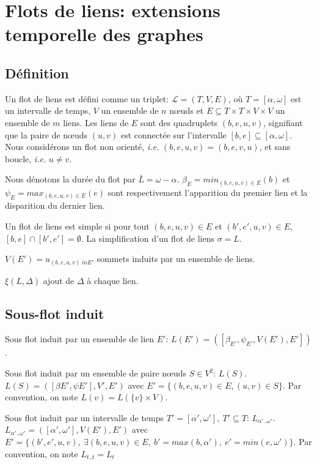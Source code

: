 \chapter{Flots de liens: extensions temporelle des graphes}
\minitoc
\label{chap:def_flot}

\section{Définition}
\label{sec:definition}
Un flot de liens est défini comme un triplet: $\mathcal{L}=(T,V,E)$, où $T=[\alpha, \omega]$ est un intervalle de temps, $V$ un ensemble de $n$ n\oe uds et $E\subseteq T\times T \times V \times V$ un ensemble de $m$ liens.
Les liens de $E$ sont des quadruplets $(b,e,u,v)$, signifiant que la paire de n\oe uds $(u, v)$ est connectée sur l'intervalle $[b,e] \subseteq [\alpha,\omega]$.
Nous considérons un flot non orienté, \emph{i.e.} $(b,e,u,v)=(b,e,v,u)$, et sans boucle, \emph{i.e.} $u \neq v$.


Nous dénotons la durée du flot par $\bar{L}=\omega-\alpha$.
$\beta_E= min_{(b,e,u,v) \in E} (b)$ et $\psi_E= max_{(b,e,u,v) \in E} (e)$ sont respectivement l'apparition du premier lien et la disparition du dernier lien.

Un flot de liens est simple si pour tout $(b,e,u,v) \in E$ et $(b',e',u, v) \in E$, $[b,e]\cap [b', e'] = \emptyset$.
La simplification d'un flot de liens $\sigma=L$.

$V(E')= {u}_{(b,e,u,v) \ in E'}$ sommets induits par un ensemble de liens.


$\xi(L,\Delta)$ ajout de $\Delta$ à chaque lien.

\section{Sous-flot induit}
Sous flot induit par un ensemble de lien $E'$: $L(E')=([\beta_{E'},\psi_{E'},V(E'),E'])$.


 
Sous flot induit par un ensemble de paire n\oe uds  $S \in V^ 2$: $L(S)$.
$L(S)=([\beta{E'},\psi{E'}],V',E')$ avec $E'= \{(b,e,u,v) \in E, (u,v) \in S\}$.
Par convention, on note $L(v)= L(\{v\}\times V)$.

Sous flot induit par un intervalle de temps $T'=[\alpha', \omega'],\ T' \subseteq T$: $L_{\alpha'..\omega'}$.
$L_{\alpha'..\omega'}=([\alpha', \omega'],V(E'),E')$ avec $E'= \{(b',e',u,v),\ \exists (b,e,u,v) \in E,\ b'= max(b,\alpha'),\ e'=min(e,\omega')\}$.
Par convention, on note $L_{t..t}=L_{t}$


